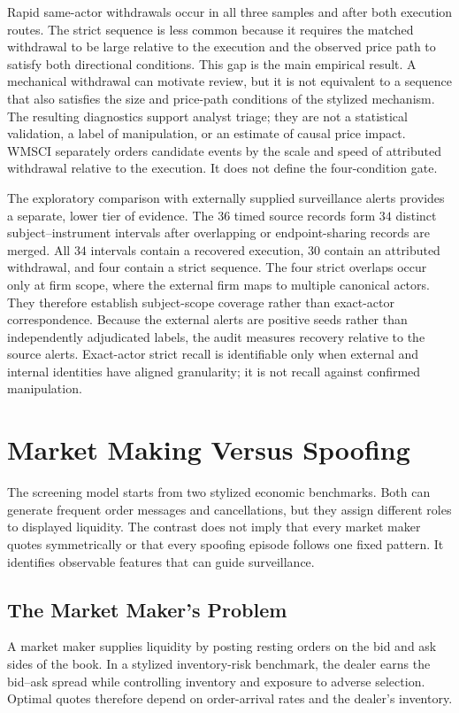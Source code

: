 \documentclass[11pt]{article}
\begin{document}
\pagebreak[4]

Rapid same-actor withdrawals occur in all three samples and after both execution routes. The strict sequence is less common
because it requires the matched withdrawal to be large relative to the execution and the observed price path to satisfy both
directional conditions. This gap is the main empirical result. A mechanical withdrawal can motivate review, but it is not
equivalent to a sequence that also satisfies the size and price-path conditions of the stylized mechanism. The resulting
diagnostics support analyst triage; they are not a statistical validation, a label of manipulation, or an estimate of causal
price impact. WMSCI separately orders candidate events by the scale and speed of attributed withdrawal relative to the
execution. It does not define the four-condition gate.

The exploratory comparison with externally supplied surveillance alerts provides a separate, lower tier of evidence. The
$36$ timed source records form $34$ distinct subject--instrument intervals after overlapping or endpoint-sharing records are
merged. All $34$ intervals contain a recovered execution, $30$ contain an attributed withdrawal, and four contain a strict
sequence. The four strict overlaps occur only at firm scope, where the external firm maps to multiple canonical actors.
They therefore establish subject-scope coverage rather than exact-actor correspondence. Because the external alerts are
positive seeds rather than independently adjudicated labels, the audit measures recovery relative to the source alerts.
Exact-actor strict recall is identifiable only when external and internal identities have aligned granularity; it is not recall
against confirmed manipulation.

\section{Market Making Versus Spoofing}
\label{sec:mm_vs_spoofing}
The screening model starts from two stylized economic benchmarks. Both can generate frequent order messages and
cancellations, but they assign different roles to displayed liquidity. The contrast does not imply that every market maker
quotes symmetrically or that every spoofing episode follows one fixed pattern. It identifies observable features that can
guide surveillance.

\subsection{The Market Maker's Problem}
\label{subsec:market_maker}
A market maker supplies liquidity by posting resting orders on the bid and ask sides of the book. In a stylized
inventory-risk benchmark, the dealer earns the bid--ask spread while controlling inventory and exposure to adverse
selection. Optimal quotes therefore depend on order-arrival rates and the dealer's inventory.
\end{document}
